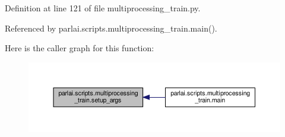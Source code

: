 Definition at line 121 of file multiprocessing\+\_\+train.\+py.



Referenced by parlai.\+scripts.\+multiprocessing\+\_\+train.\+main().

Here is the caller graph for this function\+:
\nopagebreak
\begin{figure}[H]
\begin{center}
\leavevmode
\includegraphics[width=350pt]{namespaceparlai_1_1scripts_1_1multiprocessing__train_a1ee26bddeb470040cfbceb5ee7a9fa08_icgraph}
\end{center}
\end{figure}
